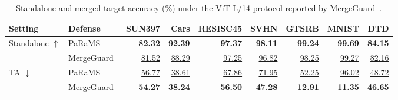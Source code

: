 \begin{table}[!t]
\centering
\small
\setlength{\tabcolsep}{3.8pt}
\caption{Standalone and merged target accuracy (\%) under the ViT-L/14 protocol reported by MergeGuard~\cite{chen2026mergeguard}.}
\label{tab:mergeguard-context}
\begin{tabular*}{\textwidth}{@{\extracolsep{\fill}}llrrrrrrr@{}}
\toprule
Setting & Defense & SUN397 & Cars & RESISC45 & SVHN & GTSRB & MNIST & DTD \\
\midrule
\multirow{2}{*}{Standalone $\uparrow$} & PaRaMS~\cite{wei2025params} & \textbf{82.32} & \textbf{92.39} & \textbf{97.37} & \textbf{98.11} & \textbf{99.24} & \textbf{99.69} & \textbf{84.15} \\
 & MergeGuard~\cite{chen2026mergeguard} & \underline{81.52} & \underline{88.29} & \underline{97.25} & \underline{96.82} & \underline{98.25} & \underline{99.27} & \underline{82.16} \\
\midrule
\multirow{2}{*}{TA $\downarrow$} & PaRaMS~\cite{wei2025params} & \underline{56.77} & \underline{38.61} & \underline{67.86} & \underline{71.95} & \underline{52.25} & \underline{96.02} & \underline{48.72} \\
 & MergeGuard~\cite{chen2026mergeguard} & \textbf{54.27} & \textbf{38.24} & \textbf{56.50} & \textbf{47.28} & \textbf{12.91} & \textbf{11.35} & \textbf{46.65} \\
\bottomrule
\end{tabular*}
\end{table}
